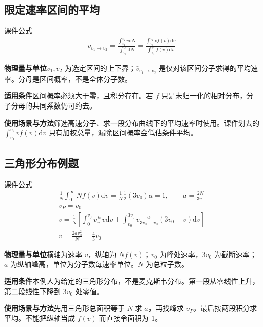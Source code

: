 \documentclass[UTF8,fontset=none,zihao=-4,a4paper]{ctexart}
\newcommand{\explain}[3]{\par\noindent\textbf{物理量与单位}\quad #1\par
\noindent\textbf{适用条件}\quad #2\par
\noindent\textbf{使用场景与方法}\quad #3\par}
\begin{document}
\par\noindent\begin{minipage}{\linewidth}
\subsection{限定速率区间的平均}
\begin{infobox}[breakable=false]{课件公式}
\begin{gather*}\bar v_{v_1\to v_2}=\frac{\int_{v_1}^{v_2}v\mathrm dN}{\int_{v_1}^{v_2}\mathrm dN}=\frac{\int_{v_1}^{v_2}vf(v)\mathrm dv}{\int_{v_1}^{v_2}f(v)\mathrm dv}\end{gather*}
\end{infobox}
\end{minipage}\par
\explain{$v_1,v_2$ 为选定区间的上下界；$\bar v_{v_1\to v_2}$ 是仅对该区间分子求得的平均速率。分母是区间概率，不是全体分子数。}{区间概率必须大于零，且积分存在。若 $f$ 只是未归一化的相对分布，分子分母的共同系数仍可约去。}{筛选高速分子、求一段分布曲线下的平均速率时使用。课件划去的 $\int_{v_1}^{v_2}vf(v)\mathrm dv$ 只有加权总量，漏除区间概率会低估条件平均。}


\par\noindent\begin{minipage}{\linewidth}
\subsection{三角形分布例题}
\begin{infobox}[breakable=false]{课件公式}
\begin{gather*}\frac1N\int_0^\infty Nf(v)\mathrm dv=\frac1N\frac12(3v_0)a=1,\qquad a=\frac{2N}{3v_0}\\v_P=v_0\\\bar v=\frac1N\left[\int_0^{v_0}v\frac a{v_0}v\mathrm dv+\int_{v_0}^{3v_0}v\frac a{3v_0-v_0}(3v_0-v)\mathrm dv\right]\\\bar v=\frac{2av_0^2}{N}=\frac43v_0\end{gather*}
\end{infobox}
\end{minipage}\par
\explain{横轴为速率 $v$，纵轴为 $Nf(v)$；$v_0$ 为峰处速率，$3v_0$ 为截断速率；$a$ 为纵轴峰高，单位为分子数每速率单位。$N$ 为总粒子数。}{本例人为给定的三角形分布，不是麦克斯韦分布。第一段从零线性上升，第二段线性下降到 $3v_0$ 处零值。}{先用三角形总面积等于 $N$ 求 $a$，再找峰求 $v_P$，最后按两段积分求平均。不能把纵轴当成 $f(v)$ 而直接令面积为 1。}
\end{document}
